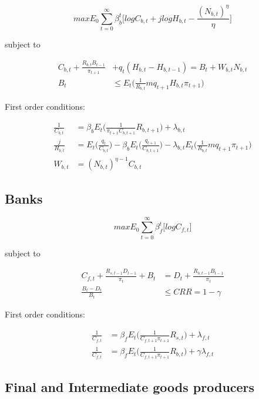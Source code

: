 \documentclass[final,3p,times,twocolumn]{elsarticle}
\begin{document}
$$max \displaystyle E_0 \sum_{t=0}^{\infty}\beta_b^t \Bigg[ log C_{b,t} + j log H_{b,t} - \frac{(N_{b,t})^\eta}{\eta} \Bigg] $$

subject to

\begin{align}C_{b,t} + \frac{R_{b,t}B_{t-1}}{\pi_{t+1}} &+ q_t(H_{b,t} - H_{b,t-1}) = B_t + W_{b,t}N_{b,t} \\
B_t &\le E_t \Bigg( \frac{1}{R_{b,t}}m q_{t+1}H_{b,t}\pi_{t+1} \Bigg) 
\end{align}

First order conditions:

\begin{align}
\frac{1}{C_{b,t}} &= \beta_b E_t\Bigg( \frac{1}{\pi_{t+1}C_{b,t+1}}R_{b,t+1} \Bigg) + \lambda_{b,t} \\
 \frac{j}{H_{b,t}} &=  E_t\Bigg( \frac{q_t}{C_{b,t}}\Bigg) - \beta_b E_t \Bigg( \frac{q_{t+1}}{C_{b,t+1}} \Bigg) - \lambda_{b,t}  E_t\Bigg(\frac{1}{R_{b,t}}mq_{t+1}\pi_{t+1}\Bigg) \\
W_{b,t} &= (N_{b,t})^{\eta-1} C_{b,t} 
\end{align}

 \subsection{Banks}

$$max \displaystyle E_0 \sum_{t=0}^{\infty}\beta_f^t \bigg[ log C_{f,t}\bigg] $$

subject to

\begin{align}
C_{f,t} + \frac{R_{s,t-1}D_{t-1}}{\pi_t} + B_t &= D_t + \frac{R_{b,t-1}B_{t-1}}{\pi_t} \\ 
\frac{B_t-D_t}{B_t} &\leq CRR = 1-\gamma 
\end{align}

First order conditions:

\begin{align}
\frac{1}{C_{f,t}} &= \beta_f E_t \Bigg( \frac{1}{C_{f,t+1}\pi_{t+1}}R_{s,t}\Bigg) + \lambda_{f,t} \\
\frac{1}{C_{f,t}} &= \beta_f E_t \Bigg( \frac{1}{C_{f,t+1}\pi_{t+1}}R_{b,t}\Bigg) + \gamma\lambda_{f,t} 
\end{align}

 \subsection{Final and Intermediate goods producers}
\end{document}
